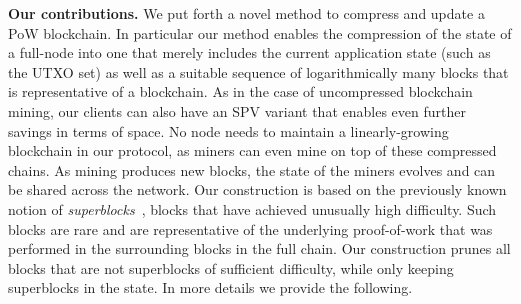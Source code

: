 {\bf  Our contributions.} We put forth a novel method to compress and update
a PoW blockchain. In particular our method enables the compression of
the state of a full-node into one that merely includes
the current application state (such as the UTXO set) as well as a suitable sequence of logarithmically many
blocks that
is representative of a blockchain. As in the case
of uncompressed blockchain mining, our clients can also have an SPV
variant that enables even further savings in terms of space.
No node needs to maintain a linearly-growing blockchain in our protocol, as
miners can even mine on top of these compressed chains. As mining produces new
blocks, the state of the miners evolves and can be shared across the network.
Our construction is based on the previously known notion of \emph{superblocks}~\cite{popow,nipopows,compactsuperblocks},
blocks that have achieved unusually high difficulty. Such blocks are rare and
are representative of the underlying proof-of-work that was performed in the
surrounding blocks in the full chain. Our construction prunes all blocks that
are not superblocks of sufficient difficulty, while only keeping superblocks in
the state.
In more details we provide the following.

